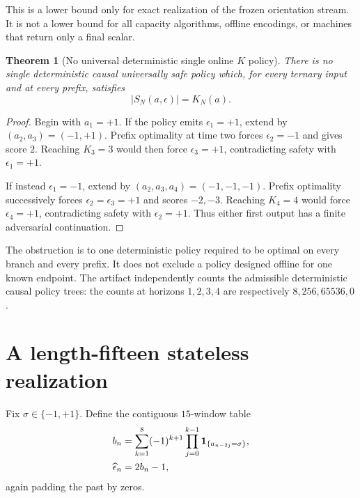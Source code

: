 \documentclass[11pt]{article}
\newtheorem{theorem}{Theorem}[section]
\theoremstyle{definition}
\theoremstyle{remark}
\newcommand{\SSS}{\{-1,+1\}}
\begin{document}
This is a lower bound only for exact realization of the frozen orientation
stream.  It is not a lower bound for all capacity algorithms, offline
encodings, or machines that return only a final scalar.

\begin{theorem}[No universal deterministic single online $K$ policy]
\label{thm:no-single}
There is no single deterministic causal universally safe policy which, for
every ternary input and at every prefix, satisfies
\begin{equation}
                  |S_N(a,\epsilon)|=K_N(a).
                  \label{eq:online-demand}
\end{equation}
\end{theorem}

\begin{proof}
Begin with $a_1=+1$.  If the policy emits $\epsilon_1=+1$, extend by
$(a_2,a_3)=(-1,+1)$.  Prefix optimality at time two forces
$\epsilon_2=-1$ and gives score $2$.  Reaching $K_3=3$ would then force
$\epsilon_3=+1$, contradicting safety with $\epsilon_1=+1$.

If instead $\epsilon_1=-1$, extend by
$(a_2,a_3,a_4)=(-1,-1,-1)$.  Prefix optimality successively forces
$\epsilon_2=\epsilon_3=+1$ and scores $-2,-3$.  Reaching $K_4=4$ would
force $\epsilon_4=+1$, contradicting safety with $\epsilon_2=+1$.
Thus either first output has a finite adversarial continuation.
\end{proof}

The obstruction is to one deterministic policy required to be optimal on
every branch and every prefix.  It does not exclude a policy designed offline for one known
endpoint.  The artifact independently counts the admissible deterministic causal policy
trees: the counts at horizons $1,2,3,4$ are respectively
$8,256,65536,0$.

\section{A length-fifteen stateless realization}

Fix $\sigma\in\SSS$.  Define the contiguous $15$-window table
\begin{align}
 b_n&=\sum_{k=1}^{8}(-1)^{k+1}
       \prod_{j=0}^{k-1}{\bf1}_{\{a_{n-2j}=\sigma\}},
       \label{eq:b-table}\\
 \widehat\epsilon_n&=2b_n-1,
       \label{eq:window-output}
\end{align}
again padding the past by zeros.
\end{document}

